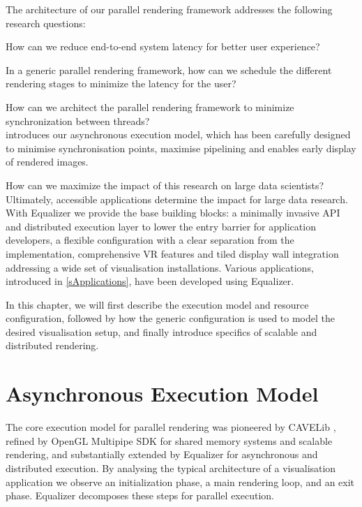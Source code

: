 The architecture of our parallel rendering framework addresses the following research questions:
\begin{compactitem}
  \item How can we reduce end-to-end system latency for better user experience?
  \item In a generic parallel rendering framework, how can we schedule the different rendering stages to minimize the latency for the user?
  \item How can we architect the parallel rendering framework to minimize synchronization between threads?\\[\smallskipamount]

 introduces our asynchronous execution model, which has been
carefully designed to minimise synchronisation points, maximise pipelining and
enables early display of rendered images.\\[\smallskipamount]

\item How can we maximize the impact of this research on large data
scientists?\\[\smallskipamount]

Ultimately, accessible applications determine the impact for large data
research. With Equalizer we provide the base building blocks: a minimally
invasive API and distributed execution layer to lower the entry barrier for
application developers, a flexible configuration with a clear separation from
the implementation, comprehensive VR features and tiled display wall
integration addressing a wide set of visualisation installations. Various
applications, introduced in \cref{sApplications}, have been developed using
Equalizer.

\end{compactitem}

In this chapter, we will first describe the execution model and resource
configuration, followed by how the generic configuration is used to model
the desired visualisation setup, and finally introduce specifics of scalable
and distributed rendering.

\section{Asynchronous Execution Model}\label{sAsyncExec}

The core execution model for parallel rendering was pioneered by CAVELib
\cite{DACNCCGHPSNS:97}, refined by OpenGL Multipipe SDK for shared memory
systems and scalable rendering, and substantially extended by Equalizer for
asynchronous and distributed execution. By analysing the typical architecture of
a visualisation application we observe an initialization phase, a main rendering
loop, and an exit phase. Equalizer decomposes these steps for parallel
execution.

